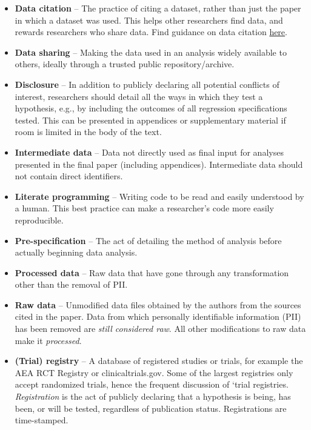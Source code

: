 \documentclass[
]{book}
\begin{document}
\begin{itemize}
\item
  \textbf{Data citation} -- The practice of citing a dataset, rather than just the paper in which a dataset was used. This helps other researchers find data, and rewards researchers who share data. Find guidance on data citation \href{https://social-science-data-editors.github.io/guidance/Data_citation_guidance.html}{here}.\\
\item
  \textbf{Data sharing} -- Making the data used in an analysis widely available to others, ideally through a trusted public repository/archive.\\
\item
  \textbf{Disclosure} -- In addition to publicly declaring all potential conflicts of interest, researchers should detail all the ways in which they test a hypothesis, e.g., by including the outcomes of all regression specifications tested. This can be presented in appendices or supplementary material if room is limited in the body of the text.
\item
  \textbf{Intermediate data} -- Data not directly used as final input for analyses presented in the final paper (including appendices). Intermediate data should not contain direct identifiers.
\item
  \textbf{Literate programming} -- Writing code to be read and easily understood by a human. This best practice can make a researcher's code more easily reproducible.
\item
  \textbf{Pre-specification} -- The act of detailing the method of analysis before actually beginning data analysis.
\item
  \textbf{Processed data} -- Raw data that have gone through any transformation other than the removal of PII.\\
\item
  \textbf{Raw data} -- Unmodified data files obtained by the authors from the sources cited in the paper. Data from which personally identifiable information (PII) has been removed are \emph{still considered raw}. All other modifications to raw data make it \emph{processed}.\\
\item
  \textbf{(Trial) registry} -- A database of registered studies or trials, for example the AEA RCT Registry or clinicaltrials.gov. Some of the largest registries only accept randomized trials, hence the frequent discussion of `trial registries. \emph{Registration} is the act of publicly declaring that a hypothesis is being, has been, or will be tested, regardless of publication status. Registrations are time-stamped.

\end{itemize}
\end{document}
